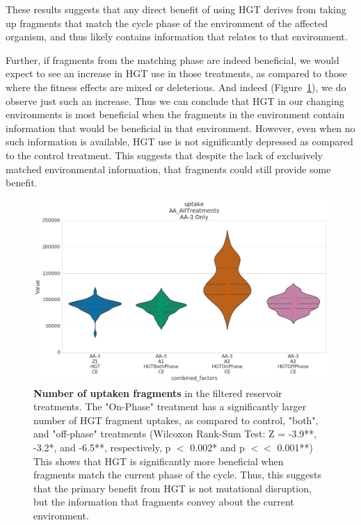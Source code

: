 \documentclass[PhD]{msu-thesis}
\begin{document}
These results suggests that any direct benefit of using HGT derives from taking up fragments that match the cycle phase of the environment of the affected organism, and thus likely contains information that relates to that environment. %

Further, if fragments from the matching phase are indeed beneficial, we would expect to see an increase in HGT use in those treatments, as compared to those where the fitness effects are mixed or deleterious. And indeed (Figure~\ref{fig:hgt_use_by_cycle_phase_source}), we do observe just such an increase. Thus we can conclude that HGT in our
changing environments is most beneficial when the fragments in the environment contain information that would be beneficial in that environment. However, even when no such information is available, HGT use is not significantly depressed as compared to the control treatment. This suggests that despite the lack of exclusively matched environmental information, that fragments could still provide some benefit. 

\begin{figure}[h!]
\begin{center}
\includegraphics[width=0.7\columnwidth]{figures/HGT/hgt_use_by_cycle_phase_source.png}
\caption{\textbf{Number of uptaken fragments} in the filtered reservoir treatments. The "On-Phase" treatment has a significantly larger number of HGT fragment uptakes, as compared to control, "both", and "off-phase" treatments (Wilcoxon Rank-Sum Test: Z = -3.9**, -3.2*, and -6.5**, respectively, p $<$ 0.002* and p $<<$ 0.001**) This shows that HGT is significantly more beneficial when fragments match the current phase of the cycle. Thus, this suggests that the primary benefit from HGT is not mutational disruption, but the information that fragments convey about the current environment.
}\label{fig:hgt_use_by_cycle_phase_source}
\end{center}
\end{figure}
\end{document}
